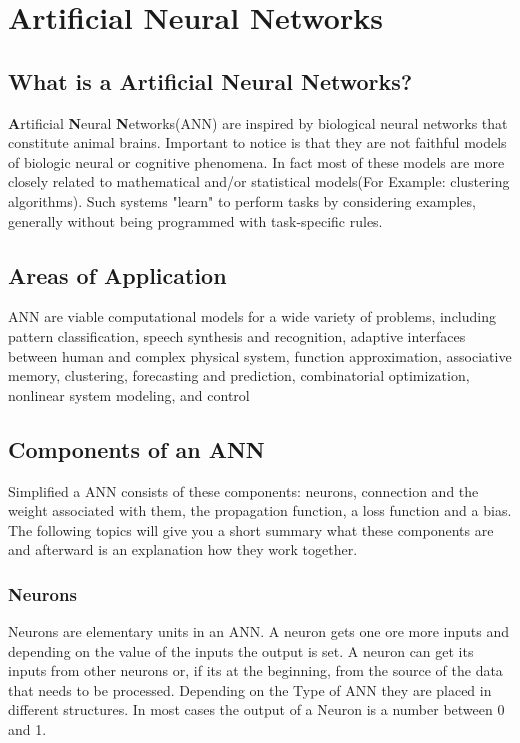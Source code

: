 \chapter{Artificial Neural Networks\authorB}

\section{What is a Artificial Neural Networks?}

  \textbf{A}rtificial \textbf{N}eural \textbf{N}etworks(ANN) are inspired by biological neural networks that constitute animal brains. Important to notice is that they are not faithful models of biologic neural or cognitive phenomena. In fact most of these models are more closely related to mathematical and/or statistical models(For Example: clustering algorithms). Such systems "learn" to perform tasks by considering examples, generally without being programmed with task-specific rules. 
 
\section{Areas of Application}

 ANN are viable computational models for a wide variety of problems, including pattern classification, speech synthesis and recognition, adaptive interfaces between human and complex physical system, function approximation, associative memory, clustering, forecasting and prediction, combinatorial optimization, nonlinear system modeling, and control
 \cite{fundamentals_ann}
 
\section{Components of an ANN}

Simplified a ANN consists of these components: neurons, connection and the weight associated with them, the propagation function, a loss function and a bias. The following topics will give you a short summary what these components are and afterward is an explanation  how they work together. 

\subsection{Neurons}

Neurons are elementary units in an ANN. A neuron gets one ore more inputs and depending on the value of the inputs the output is set. A neuron can get its inputs from other neurons or, if its at the beginning, from the source of the data that needs to be processed. Depending on the Type of ANN they are placed in different structures. In most cases the output of a Neuron is a number between 0 and 1.


